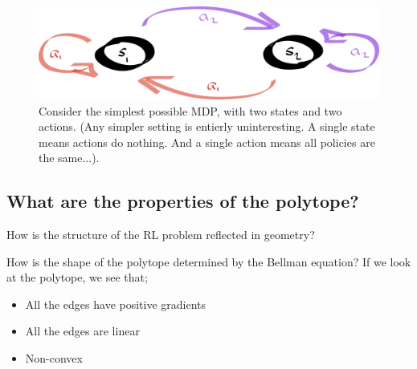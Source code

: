 \begin{figure}
\centering
\includegraphics[width=1\textwidth,height=0.25\textheight]{../../pictures/drawings/2-state-automata.png}
\caption{Consider the simplest possible MDP, with two states and two actions. (Any simpler setting is entierly uninteresting. A single state means actions do nothing.
And a single action means all policies are the same...).}
\end{figure}



\subsection{What are the properties of the polytope?}

\begin{displayquote}
  How is the structure of the RL problem reflected in geometry?
\end{displayquote}

How is the shape of the polytope determined by the Bellman equation?
If we look at the polytope, we see that;
\begin{itemize}
\tightlist
\item
  All the edges have positive gradients
\item
  All the edges are linear
\item
  Non-convex
\end{itemize}



